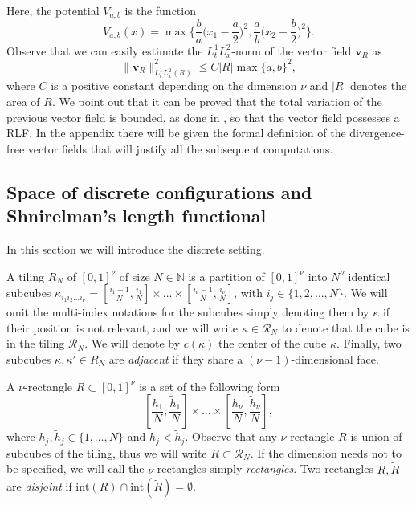 \documentclass[12 pt]{article}
\theoremstyle{definition} \newtheorem{definition}{Definition}[section]
\theoremstyle{definition} \newtheorem{remark}[definition]{Remark}
\theoremstyle{plain} \newtheorem{lemma}[definition]{Lemma}
\theoremstyle{plain} \newtheorem{proposition}[definition]{Proposition}
\theoremstyle{plain} \newtheorem{theorem}[definition]{Theorem}
\theoremstyle{plain} \newtheorem{corollary}[definition]{Corollary}
\theoremstyle{definition} \newtheorem{example}[definition]{Example}
\theoremstyle{definition} \newtheorem{assumption}[definition]{Assumption}
\theoremstyle{definition} \newtheorem{conjecture}[definition]{Conjecture}
\newcommand{\1}{\mathbbm 1}
\numberwithin{equation}{section}
\begin{document}
Here, the potential $V_{a,b}$ is the function
\begin{equation*}
V_{a,b}(x) = \max \bigg\{ \frac{b}{a} \bigg( x_1 - \frac{a}{2} \bigg)^2, \frac{a}{b} \bigg( x_2 - \frac{b}{2} \bigg)^2 \bigg\}.
\end{equation*}
Observe that we can easily estimate the $L^1_tL^2_x$-norm of the vector field $ \mathbf v_R$ as
\begin{equation*}
    \| \mathbf v_R\|^2_{L^1_tL^2_x(R)}\leq C|R|\max{\lbrace a,b\rbrace }^2,
\end{equation*}
where $C$ is a positive constant depending on the dimension $\nu$ and $|R|$ denotes the area of $R$. 
We point out that it can be proved that the total variation of the previous vector field is bounded, as done in \cite{Bianchini_Zizza_residuality}, so that the vector field possesses a RLF. In the appendix there will be given the formal definition of the divergence-free vector fields that will justify all the subsequent computations.


 


\subsection{Space of discrete configurations and Shnirelman's length functional}\label{SS:space:discrete:conf}

In this section we will introduce the discrete setting. 

\medskip
A tiling $R_N$ of $[0,1]^\nu$ of size $N\in\mathbb{N}$ is a partition of $[0,1]^\nu$ into $N^\nu$ identical subcubes $\kappa_{i_1i_2\dots i_\nu}= \left[\frac{i_1-1}{N},\frac{i_1}{N}\right]\times\dots\times \left[\frac{i_\nu-1}{N},\frac{i_\nu}{N}\right]$, with $i_j\in\lbrace 1,2,\dots,N\rbrace$. We will omit the multi-index notations for the subcubes simply denoting them by $\kappa$ if their position is not relevant, and we will write $\kappa\in \mathcal{R}_N$ to denote that the cube is in the tiling $\mathcal{R}_N$. We will denote by $c(\kappa)$ the center of the cube $\kappa$. Finally, two subcubes $\kappa,\kappa'\in R_N$ are \emph{adjacent} if they share a $(\nu-1)$-dimensional face.

\medskip


A $\nu$-rectangle $R\subset[0,1]^\nu$ is a set of the following form
\begin{equation*}
    \left[\frac{ h_1}{N},\frac{\tilde h_1}{N}\right]\times\dots\times \left[\frac{h_\nu}{N},\frac{\tilde h_\nu}{N}\right],
\end{equation*}
 where $h_j,\tilde h_j\in\lbrace 1,\dots,N\rbrace$ and $h_j<\tilde h_j$. Observe that any $\nu$-rectangle $R$ is union of subcubes of the tiling, thus we will write $R\subset \mathcal R_N$. If the dimension needs not to be specified, we will call the $\nu$-rectangles simply \emph{rectangles}. Two rectangles $R,\tilde R$ are \emph{disjoint} if $\text{int}(R)\cap\text{int}(\tilde R)=\emptyset.$
 
\end{document}
